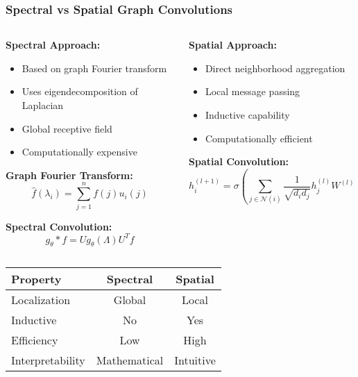 \begin{frame}[fragile]\frametitle{Spectral vs Spatial Graph Convolutions}

\begin{columns}
\begin{column}{0.5\textwidth}
\textbf{Spectral Approach:}
\begin{itemize}
\item Based on graph Fourier transform
\item Uses eigendecomposition of Laplacian
\item Global receptive field
\item Computationally expensive
\end{itemize}

\textbf{Graph Fourier Transform:}
$$\hat{f}(\lambda_i) = \sum_{j=1}^n f(j) u_i(j)$$

\textbf{Spectral Convolution:}
$$g_\theta * f = U g_\theta(\Lambda) U^T f$$
\end{column}
\begin{column}{0.5\textwidth}
\textbf{Spatial Approach:}
\begin{itemize}
\item Direct neighborhood aggregation
\item Local message passing
\item Inductive capability
\item Computationally efficient
\end{itemize}

\textbf{Spatial Convolution:}
$$h_i^{(l+1)} = \sigma\left(\sum_{j \in \mathcal{N}(i)} \frac{1}{\sqrt{d_i d_j}} h_j^{(l)} W^{(l)}\right)$$
\end{column}
\end{columns}

\vspace{0.5cm}

\begin{center}
\begin{tabular}{|l|c|c|}
\hline
\textbf{Property} & \textbf{Spectral} & \textbf{Spatial} \\
\hline
Localization & Global & Local \\
Inductive & No & Yes \\
Efficiency & Low & High \\
Interpretability & Mathematical & Intuitive \\
\hline
\end{tabular}
\end{center}

\end{frame}

